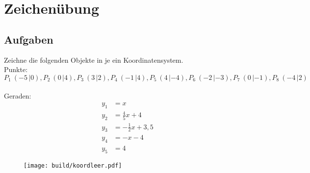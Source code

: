 


    \section*{Zeichenübung}
    \subsection*{Aufgaben}
    Zeichne die folgenden Objekte in je ein Koordinatensystem.\\
    Punkte:\\
    $P_1\:(-5\,|0), P_2\:(0\,|4), P_3\:(3\,|2), P_4\:(-1\,|4), P_5\:(4\,|-4), P_6\:(-2\,|-3), P_7\:(0\,|-1), P_8\:(-4\,|2)$\\~\\
    Geraden:
    \begin{align}
        y_1&=x\\
        y_2&=\frac{4}{5}x+4\\
        y_3&=-\frac{1}{2}x+3,5\\
        y_4&=-x-4\\
        y_5&=4
    \end{align}
    \begin{figure}
        \centering
        \texttt{[image: build/koordleer.pdf]}
    \end{figure}
    
